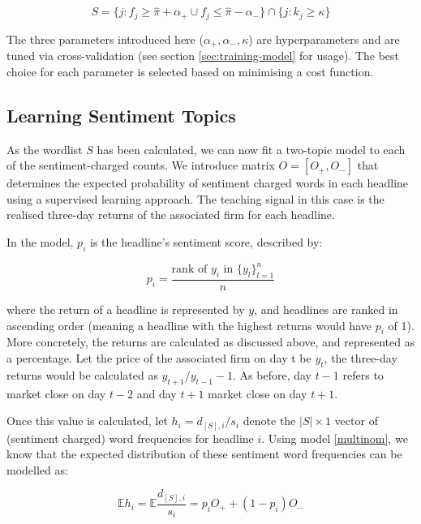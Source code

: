 \begin{equation}
S = \{j : f_j \ge \hat \pi + \alpha_+ \cup f_j \le \hat \pi - \alpha_- \} \cap  \{ j : k_j \ge \kappa \}
\end{equation}

\noindent
The three parameters introduced here ($\alpha_+, \alpha_-, \kappa$) are hyperparameters and are tuned via cross-validation (see section \ref{sec:training-model} for usage). The best choice for each parameter is selected based on minimising a cost function.

\subsection{Learning Sentiment Topics}
\label{sub:learn-sentiment}
As the wordlist $S$ has been calculated, we can now fit a two-topic model to each of the sentiment-charged counts. We introduce matrix $O = [O_+,O_-]$ that determines the expected probability of sentiment charged words in each headline using a supervised learning approach. The teaching signal in this case is the realised three-day returns of the associated firm for each headline.

In the model, $p_i$ is the headline's sentiment score, described by:

\begin{equation}
p_i = \frac{\text{rank of } y_i \text{ in } \{y_l\}_{l=1}^n}{n}
\label{sentiment}
\end{equation}

\noindent
where the return of a headline is represented by $y$, and headlines are ranked in ascending order (meaning a headline with the highest returns would have $p_i$ of 1). More concretely, the returns are calculated as discussed above, and represented as a percentage. Let the price of the associated firm on day t be $y_t$, the three-day returns would be calculated as $y_{t+1}/y_{t-1} - 1$. As before, day $t-1$ refers to market close on day $t-2$ and day $t+1$ market close on day $t+1$.

Once this value is calculated, let $h_i = d_{[S],i}/s_i$ denote the $|S| \times 1$ vector of (sentiment charged) word frequencies for headline $i$. Using model \ref{multinom}, we know that the expected distribution of these sentiment word frequencies can be modelled as:

\begin{equation}
\mathbb{E}h_i = \mathbb{E}\frac{d_{[S],i}}{s_i} = p_i O_+ + (1-p_i)O_-
\end{equation}

